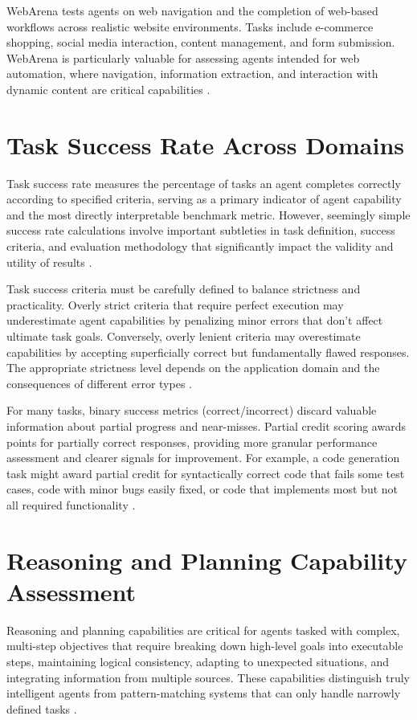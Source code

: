 \begin{TNtwocol}
WebArena tests agents on web navigation and the completion of web-based workflows across realistic website environments. Tasks include e-commerce shopping, social media interaction, content management, and form submission. WebArena is particularly valuable for assessing agents intended for web automation, where navigation, information extraction, and interaction with dynamic content are critical capabilities \cite{zhou2023}.

\section{Task Success Rate Across Domains}
Task success rate measures the percentage of tasks an agent completes correctly according to specified criteria, serving as a primary indicator of agent capability and the most directly interpretable benchmark metric. However, seemingly simple success rate calculations involve important subtleties in task definition, success criteria, and evaluation methodology that significantly impact the validity and utility of results \cite{liu2023,jimenez2024}.

Task success criteria must be carefully defined to balance strictness and practicality. Overly strict criteria that require perfect execution may underestimate agent capabilities by penalizing minor errors that don't affect ultimate task goals. Conversely, overly lenient criteria may overestimate capabilities by accepting superficially correct but fundamentally flawed responses. The appropriate strictness level depends on the application domain and the consequences of different error types \cite{liu2023}.

For many tasks, binary success metrics (correct/incorrect) discard valuable information about partial progress and near-misses. Partial credit scoring awards points for partially correct responses, providing more granular performance assessment and clearer signals for improvement. For example, a code generation task might award partial credit for syntactically correct code that fails some test cases, code with minor bugs easily fixed, or code that implements most but not all required functionality \cite{jimenez2024}.

\section{Reasoning and Planning Capability Assessment}
Reasoning and planning capabilities are critical for agents tasked with complex, multi-step objectives that require breaking down high-level goals into executable steps, maintaining logical consistency, adapting to unexpected situations, and integrating information from multiple sources. These capabilities distinguish truly intelligent agents from pattern-matching systems that can only handle narrowly defined tasks \cite{valmeekam2023,wei2022,yao2023}.


\end{TNtwocol}
